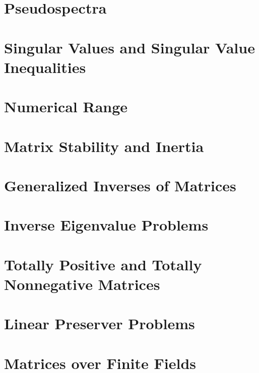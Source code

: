 \documentclass[a4paper]{article}
\begin{document}
\section{Pseudospectra}

\section{Singular Values and Singular Value Inequalities}

\section{Numerical Range}

\section{Matrix Stability and Inertia}

\section{Generalized Inverses of Matrices}

\section{Inverse Eigenvalue Problems}

\section{Totally Positive and Totally Nonnegative Matrices}

\section{Linear Preserver Problems}

\section{Matrices over Finite Fields}
\end{document}
